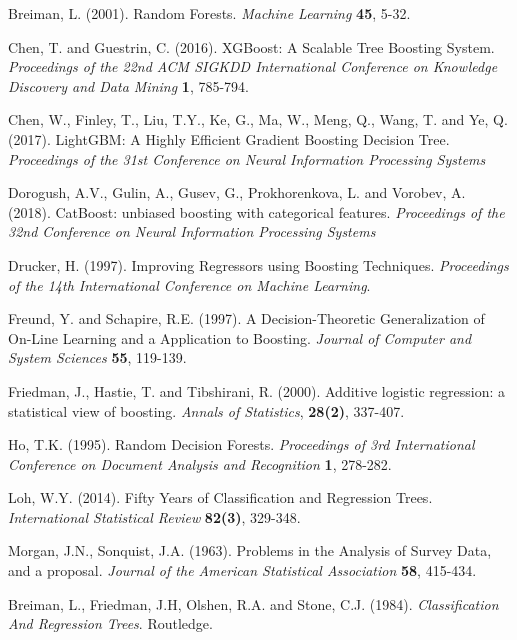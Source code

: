 \documentclass[12pt,twoside]{article}
\begin{document}
\newpage
{}
\begin{thebibliography}{100}
 Breiman, L. (2001). Random Forests. \textit{Machine Learning} \textbf{45}, 5-32.

 Chen, T. and Guestrin, C. (2016). XGBoost: A Scalable Tree Boosting System. \textit{Proceedings of the 22nd ACM SIGKDD International Conference on Knowledge Discovery and Data Mining} \textbf{1}, 785-794.

 Chen, W., Finley, T., Liu, T.Y., Ke, G., Ma, W., Meng, Q., Wang, T. and Ye, Q. (2017). LightGBM: A Highly Efficient Gradient Boosting Decision Tree. \textit{Proceedings of the 31st Conference on Neural Information Processing Systems}

 Dorogush, A.V., Gulin, A., Gusev, G., Prokhorenkova, L. and Vorobev, A. (2018). CatBoost: unbiased boosting with categorical features. \textit{Proceedings of the 32nd Conference on Neural Information Processing Systems}

 Drucker, H. (1997). Improving Regressors using Boosting Techniques. \textit{Proceedings of the 14th International Conference on Machine Learning}.

 Freund, Y. and Schapire, R.E. (1997). A Decision-Theoretic Generalization of On-Line Learning and a Application to Boosting. \textit{Journal of Computer and System Sciences} \textbf{55}, 119-139.

 Friedman, J., Hastie, T. and Tibshirani, R. (2000). Additive logistic regression: a statistical view of boosting. \textit{Annals of Statistics}, \textbf{28(2)}, 337-407.

 Ho, T.K. (1995). Random Decision Forests. \textit{Proceedings of 3rd International Conference on Document Analysis and Recognition} \textbf{1}, 278-282.

 Loh, W.Y. (2014). Fifty Years of Classification and Regression Trees. \textit{International Statistical Review}
\textbf{82(3)}, 329-348.

 Morgan, J.N., Sonquist, J.A. (1963). Problems in the Analysis of Survey Data, and a proposal. \textit{Journal of the American Statistical Association} \textbf{58}, 415-434.



 Breiman, L., Friedman, J.H, Olshen, R.A. and Stone, C.J. (1984).
\textit{Classification And Regression Trees}. Routledge.


\end{thebibliography}
\end{document}
